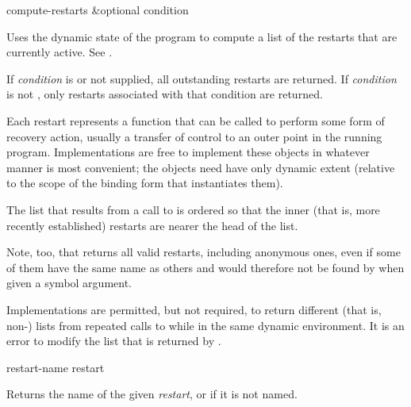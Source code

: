 \begin{defun}[Function]
compute-restarts &optional condition

  Uses the dynamic state of the program to compute a list of the restarts
  that are currently active. See .

If \emph{condition} is  or not supplied, all outstanding restarts
are returned.
If \emph{condition} is not , only restarts associated
with that condition are returned.

  Each restart represents a function that can be called to perform some
  form of recovery action, usually a transfer of control to an outer point
  in the running program. Implementations are free to implement these objects
  in whatever manner is most convenient; the objects need have only dynamic
  extent (relative to the scope of the binding form that instantiates them).

  The list that results from a call to  is ordered so that
  the inner (that is, more recently established) restarts are nearer the head
  of the list.

  Note, too, that  returns all valid restarts, including
  anonymous ones, even if some of them have the same name as others and
  would therefore not be found by  when given a symbol argument.

  Implementations are permitted, but not required, to return different 
  (that is, non-) lists from repeated calls to  while in
  the same dynamic environment. It is an error to modify the list that
  is returned by .
\end{defun}


\begin{defun}[Function]
restart-name restart

  Returns the name of the given \emph{restart}, or  if it is not named.
\end{defun}

